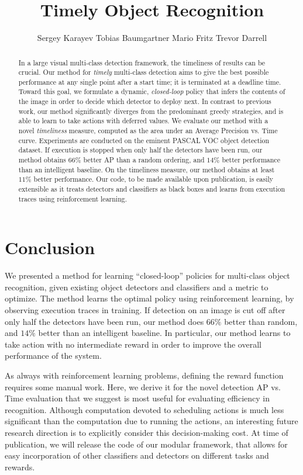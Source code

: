 \documentclass{article} %
\title{Timely Object Recognition}
\author{
Sergey Karayev \And
Tobias Baumgartner \And
Mario Fritz \And
Trevor Darrell
}
\begin{document}
\maketitle

\begin{abstract}
In a large visual multi-class detection framework, the timeliness of results can be crucial.
Our method for \emph{timely} multi-class detection aims to give the best possible performance at any single point after a start time; it is terminated at a deadline time.
Toward this goal, we formulate a dynamic, \emph{closed-loop} policy that infers the contents of the image in order to decide which detector to deploy next.
In contrast to previous work, our method significantly diverges from the predominant greedy strategies, and is able to learn to take actions with deferred values.
We evaluate our method with a novel \emph{timeliness} measure, computed as the area under an Average Precision vs. Time curve.
Experiments are conducted on the eminent PASCAL VOC object detection dataset.
If execution is stopped when only half the detectors have been run, our method obtains $66\%$ better AP than a random ordering, and $14\%$ better performance than an intelligent baseline.
On the timeliness measure, our method obtains at least $11\%$ better performance.
Our code, to be made available upon publication, is easily extensible as it treats detectors and classifiers as black boxes and learns from execution traces using reinforcement learning.
\end{abstract}






\section{Conclusion}
We presented a method for learning ``closed-loop'' policies for multi-class object recognition, given existing object detectors and classifiers and a metric to optimize.
The method learns the optimal policy using reinforcement learning, by observing execution traces in training.
If detection on an image is cut off after only half the detectors have been run, our method does $66\%$ better than random, and $14\%$ better than an intelligent baseline. In particular, our method learns to take action with no intermediate reward in order to improve the overall performance of the system.

As always with reinforcement learning problems, defining the reward function requires some manual work.
Here, we derive it for the novel detection AP vs. Time evaluation that we suggest is most useful for evaluating efficiency in recognition.
Although computation devoted to scheduling actions is much less significant than the computation due to running the actions, an interesting future research direction is to explicitly consider this decision-making cost.
At time of publication, we will release the code of our modular framework, that allows for easy incorporation of other classifiers and detectors on different tasks and rewards.
\end{document}
